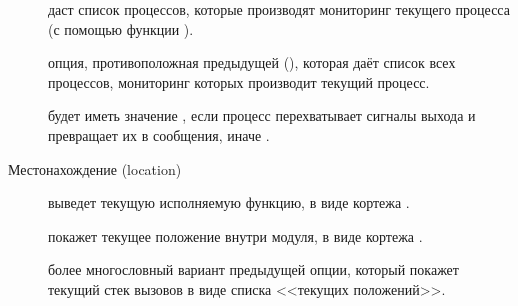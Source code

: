 \documentclass[11pt, oneside]{book}   	%
\begin{document}
\begin{description*}
\begin{description}
		\item[] даст список процессов, которые производят мониторинг текущего процесса (с помощью функции  ).
		
		\item[] опция, противоположная предыдущей  (), которая даёт список всех процессов, мониторинг которых производит текущий процесс.
				
		\item[] будет иметь значение , если процесс перехватывает сигналы выхода и превращает их в сообщения, иначе .
	\end{description}		
		
	\item[Местонахождение (location)] \hfill
		\begin{description}
	\item[] выведет текущую исполняемую функцию, в виде кортежа .

	\item[] покажет текущее положение внутри модуля, в виде кортежа .
			
	\item[] более многословный вариант предыдущей опции, который покажет текущий стек вызовов в виде списка <<текущих положений>>.
			

\end{description}
\end{description*}
\end{document}
